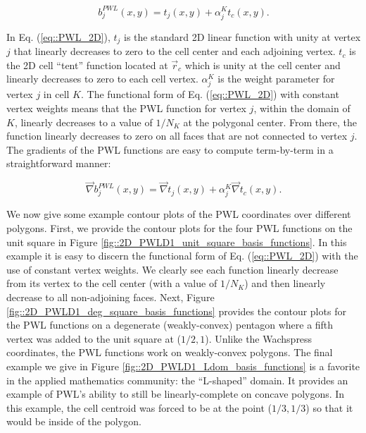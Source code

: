 \begin{equation}
\label{eq::PWL_2D}
	b_j^{PWL} (x,y) = t_j (x,y) + \alpha_j^K t_c (x,y) .
\end{equation}

\noindent In Eq. (\ref{eq::PWL_2D}), $t_j$ is the standard 2D linear function with unity at vertex $j$ that linearly decreases to zero to the cell center and each adjoining vertex. $t_c$ is the 2D cell ``tent'' function located at $\vec{r}_{c}$ which is unity at the cell center and linearly decreases to zero to each cell vertex. $\alpha_{j}^{K}$ is the weight parameter for vertex $j$ in cell $K$. The functional form of Eq. (\ref{eq::PWL_2D}) with constant vertex weights means that the PWL function for vertex $j$, within the domain of $K$, linearly decreases to a value of $1/N_K$ at the polygonal center. From there, the function linearly decreases to zero on all faces that are not connected to vertex $j$. The gradients of the PWL functions are easy to compute term-by-term in a straightforward manner:

\begin{equation}
\label{eq::PWL_2D_gradients}
	\vec{\nabla} b_j^{PWL} (x,y) = \vec{\nabla} t_j (x,y) + \alpha_j^K \vec{\nabla} t_c (x,y) .
\end{equation}

We now give some example contour plots of the PWL coordinates over different polygons. First, we provide the contour plots for the four PWL functions on the unit square in Figure \ref{fig::2D_PWLD1_unit_square_basis_functions}. In this example it is easy to discern the functional form of Eq. (\ref{eq::PWL_2D}) with the use of constant vertex weights. We clearly see each function linearly decrease from its vertex to the cell center (with a value of $1/N_K$) and then linearly decrease to all non-adjoining faces. Next, Figure \ref{fig::2D_PWLD1_deg_square_basis_functions} provides the contour plots for the PWL functions on a degenerate (weakly-convex) pentagon where a fifth vertex was added to the unit square at ($1/2,1$). Unlike the Wachspress coordinates, the PWL functions work on weakly-convex polygons. The final example we give in Figure \ref{fig::2D_PWLD1_Ldom_basis_functions} is a favorite in the applied mathematics community: the ``L-shaped'' domain. It provides an example of PWL's ability to still be linearly-complete on concave polygons. In this example, the cell centroid was forced to be at the point ($1/3,1/3$) so that it would be inside of the polygon.


